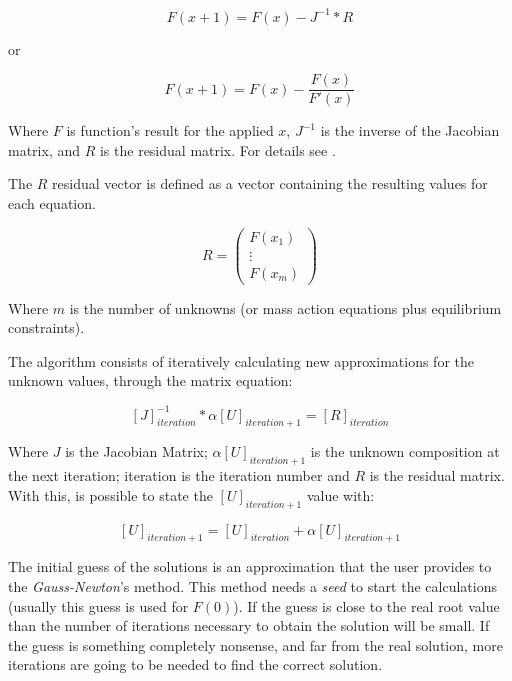 \documentclass[ppgc,mestrado,english]{iiufrgs}
\begin{document}
\begin{equation}
\label{eq:gaussNewtonMethodEq1}
F(x+1) = F(x) - J^{-1} * R
\end{equation}

or 

\begin{equation}
\label{eq:gaussNewtonMethodEq2}
F(x+1) = F(x) - \frac{F(x)}{F'(x)}
\end{equation}

Where $F$ is function's result for the applied $x$, $J^{-1}$ is the inverse of the Jacobian matrix, and $R$ is the residual matrix. For details see \cite{Isaacson:66}.

The $R$ residual vector is defined as a vector containing the resulting values for each equation.

\begin{equation}
\label{eq:residualVector}
R = \begin{pmatrix}
 F(x_1) \\
 \vdots \\
 F(x_m)
 \end{pmatrix}
\end{equation}

Where $m$ is the number of unknowns (or mass action equations plus equilibrium constraints).


The algorithm consists of iteratively calculating new approximations for the unknown values, through the matrix equation:

\begin{equation}
\label{eq:iterativelyAlgorithm}
[J]^{-1}_{iteration}* \alpha [U]_{iteration+1} = [R]_{iteration}
\end{equation}

Where $J$ is the Jacobian Matrix; $ \alpha [U]_{iteration+1} $ is the unknown composition at the next iteration; iteration is the iteration number and $R$ is the residual matrix. With this, is possible to state the $[U]_{iteration+1}$ value with:

\begin{equation}
\label{eq:CompositionCalculation}
[U]_{iteration+1} = [U]_{iteration} + \alpha [U]_{iteration+1}
\end{equation}


The initial guess of the solutions is an approximation that the user provides to the \emph{Gauss-Newton}'s method. This method needs a \emph{seed} to start the calculations (usually this guess is used for $F(0)$). If the guess is close to the real root value than the number of iterations necessary to obtain the solution will be small. If the guess is something completely nonsense, and far from the real solution, more iterations are going to be needed to find the correct solution.
\end{document}
